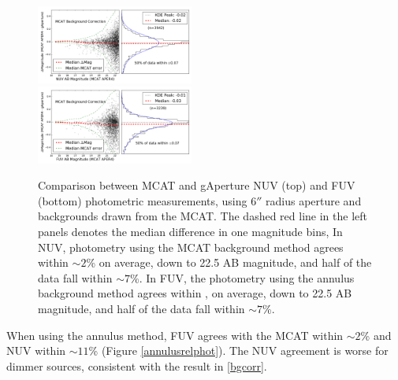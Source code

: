 \documentclass[trackchanges,preprint2]{aastex}
\begin{document}
\begin{figure}[h!]
\includegraphics[width=0.46\textwidth,keepaspectratio]{Fig04a.pdf}\\
\includegraphics[width=0.46\textwidth,keepaspectratio]{Fig04b.pdf}
\caption{Comparison between MCAT and gAperture NUV (top) and FUV (bottom) photometric measurements, using $6''$ radius aperture and backgrounds drawn from the MCAT. The  dashed red line in the left panels denotes the median difference  in one magnitude bins,   In NUV, photometry using the MCAT background method agrees within $\sim 2$\% on average, down to 22.5 AB magnitude, and half of the data fall within $\sim 7$\%. In FUV, the photometry using the annulus background method agrees within , on average, down to 22.5 AB magnitude, and half of the data fall within $\sim 7$\%.
\label{mcatrelphot}}
\end{figure}

When using the annulus method, FUV agrees with the MCAT within $\sim 2$\% and NUV within $\sim 11$\% (Figure \ref{annulusrelphot}). The NUV agreement is worse for dimmer sources, consistent with the result in \ref{bgcorr}. 
\end{document}

